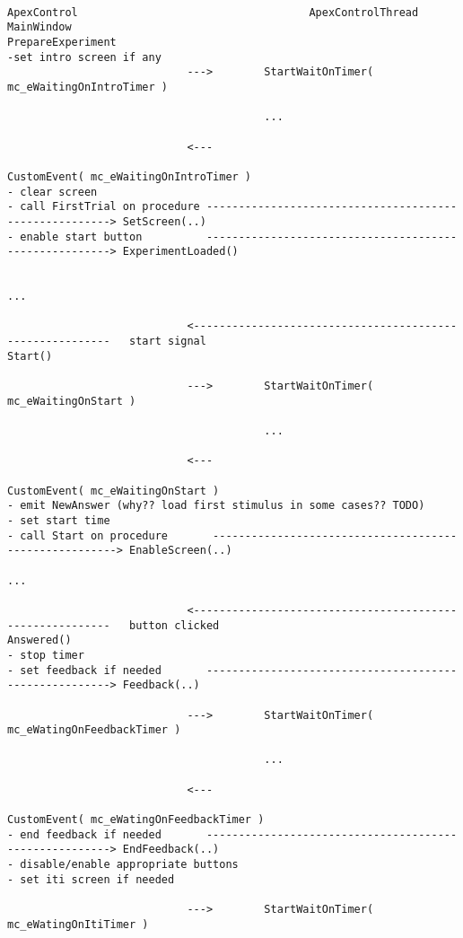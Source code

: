 \documentclass[a4paper,12pt]{article}
\begin{document}
\begin{landscape}
\label{main}
\begin{verbatim}

ApexControl                                    ApexControlThread                          MainWindow
PrepareExperiment
-set intro screen if any
                            --->        StartWaitOnTimer( mc_eWaitingOnIntroTimer )

                                        ...

                            <---

CustomEvent( mc_eWaitingOnIntroTimer )
- clear screen
- call FirstTrial on procedure -------------------------------------------------------> SetScreen(..)
- enable start button          -------------------------------------------------------> ExperimentLoaded()


...

                            <---------------------------------------------------------   start signal
Start()

                            --->        StartWaitOnTimer( mc_eWaitingOnStart )

                                        ...

                            <---

CustomEvent( mc_eWaitingOnStart )
- emit NewAnswer (why?? load first stimulus in some cases?? TODO)
- set start time
- call Start on procedure       -------------------------------------------------------> EnableScreen(..)

...

                            <---------------------------------------------------------   button clicked
Answered()
- stop timer
- set feedback if needed       -------------------------------------------------------> Feedback(..)

                            --->        StartWaitOnTimer( mc_eWatingOnFeedbackTimer )

                                        ...

                            <---

CustomEvent( mc_eWatingOnFeedbackTimer )
- end feedback if needed       -------------------------------------------------------> EndFeedback(..)
- disable/enable appropriate buttons
- set iti screen if needed

                            --->        StartWaitOnTimer( mc_eWatingOnItiTimer )


\end{verbatim}
\end{landscape}
\end{document}
